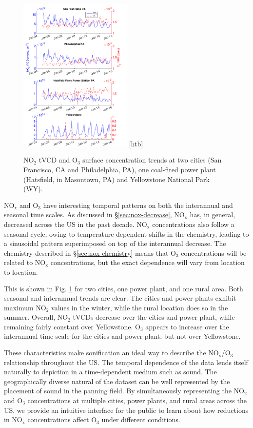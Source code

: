 \documentclass[a4paper,10pt,oneside]{article}
\newcommand{\ce}[1]{$\mathrm{#1}$}
\begin{document}
\begin{sloppy}
\begin{figure}
\centering
\includegraphics[width=0.5\textwidth]{figs/four-site-trends.png} [htb]
\caption{\ce{NO_2} tVCD and \ce{O_3} surface concentration trends at two cities (San Francisco, CA and Philadelphia, PA), one coal-fired power plant (Hatsfield, in Masontown, PA) and Yellowstone National Park (WY).}
\label{fig:trends}
\end{figure}

\ce{NO_x} and \ce{O_3} have interesting temporal patterns on both the interannual and seasonal time scales. As discussed in \S\ref{sec:nox-decrease}, \ce{NO_x} has, in general, decreased across the US in the past decade. \ce{NO_x} concentrations also follow a seasonal cycle, owing to temperature dependent shifts in the chemistry, leading to a sinusoidal pattern superimposed on top of the interannual decrease.  The chemistry described in \S\ref{sec:nox-chemistry} means that \ce{O_3} concentrations will be related to \ce{NO_x} concentrations, but the exact dependence will vary from location to location.

This is shown in Fig. \ref{fig:trends} for two cities, one power plant, and one rural area. Both seasonal and interannual trends are clear. The cities and power plants exhibit maximum \ce{NO_2} values in the winter, while the rural location does so in the summer. Overall, \ce{NO_2} tVCDs decrease over the cities and power plant, while remaining fairly constant over Yellowstone. \ce{O_3} appears to increase over the interannual time scale for the cities and power plant, but not over Yellowstone. 

These characteristics make sonification an ideal way to describe the \ce{NO_x}/\ce{O_3} relationship throughout the US. The temporal dependence of the data lends itself naturally to depiction in a time-dependent medium such as sound. The geographically diverse natural of the dataset can be well represented by the placement of sound in the panning field. By simultaneously representing the \ce{NO_2} and \ce{O_3} concentrations at multiple cities, power plants, and rural areas across the US, we provide an intuitive interface for the public to learn about how reductions in \ce{NO_x} concentrations affect \ce{O_3} under different conditions.
	

\end{sloppy}
\end{document}
